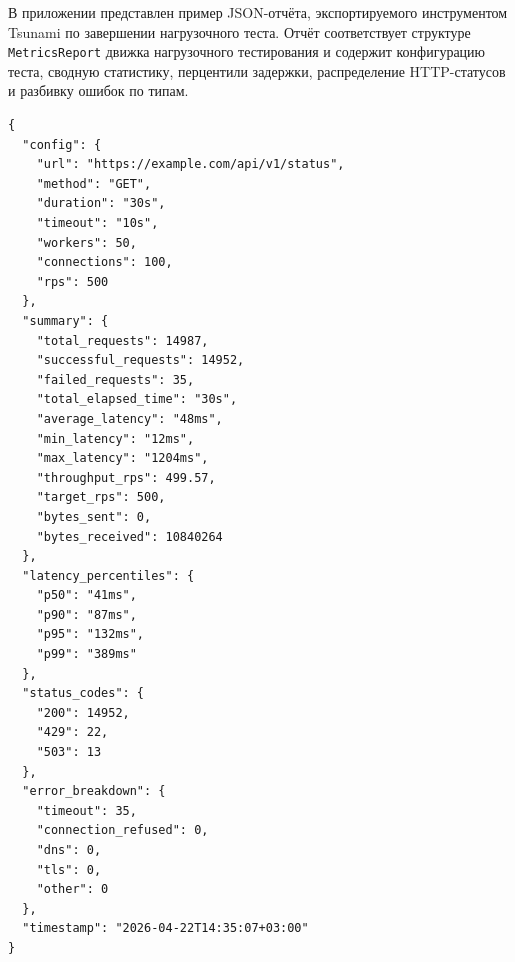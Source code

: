 В приложении представлен пример JSON-отчёта, экспортируемого инструментом Tsunami
по завершении нагрузочного теста.
Отчёт соответствует структуре \texttt{MetricsReport} движка нагрузочного тестирования
и содержит конфигурацию теста, сводную статистику, перцентили задержки,
распределение HTTP-статусов и разбивку ошибок по типам.

\begin{lstlisting}[language={},caption={Пример JSON-отчёта результатов нагрузочного теста},label={lst:app-report}]
{
  "config": {
    "url": "https://example.com/api/v1/status",
    "method": "GET",
    "duration": "30s",
    "timeout": "10s",
    "workers": 50,
    "connections": 100,
    "rps": 500
  },
  "summary": {
    "total_requests": 14987,
    "successful_requests": 14952,
    "failed_requests": 35,
    "total_elapsed_time": "30s",
    "average_latency": "48ms",
    "min_latency": "12ms",
    "max_latency": "1204ms",
    "throughput_rps": 499.57,
    "target_rps": 500,
    "bytes_sent": 0,
    "bytes_received": 10840264
  },
  "latency_percentiles": {
    "p50": "41ms",
    "p90": "87ms",
    "p95": "132ms",
    "p99": "389ms"
  },
  "status_codes": {
    "200": 14952,
    "429": 22,
    "503": 13
  },
  "error_breakdown": {
    "timeout": 35,
    "connection_refused": 0,
    "dns": 0,
    "tls": 0,
    "other": 0
  },
  "timestamp": "2026-04-22T14:35:07+03:00"
}
\end{lstlisting}
